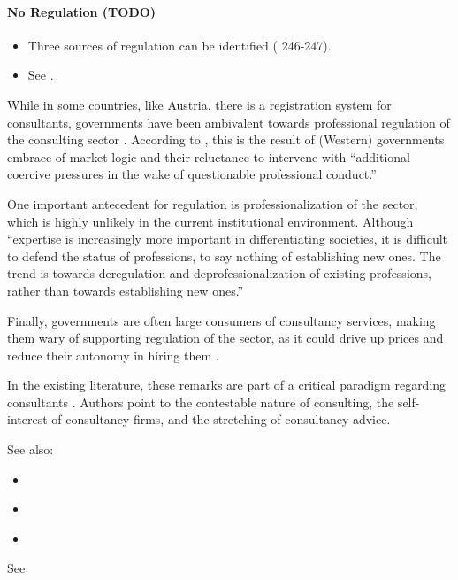 \documentclass[12pt]{article}
\providecommand{\tightlist}{%
  \setlength{\itemsep}{0pt}\setlength{\parskip}{0pt}}
\begin{document}
\paragraph{No Regulation (TODO)}\label{no-regulation-todo}

\begin{itemize}
\tightlist
\item
  Three sources of regulation can be identified (\citet{clark1993}
  246-247).
\item
  See \citet[813-817]{muzio2011}.
\end{itemize}

While in some countries, like Austria, there is a registration system
for consultants, governments have been ambivalent towards professional
regulation of the consulting sector \citep[ 814]{muzio2011}. According
to \citet{leicht2006}, this is the result of (Western) governments
embrace of market logic and their reluctance to intervene with
``additional coercive pressures in the wake of questionable professional
conduct.''

One important antecedent for regulation is professionalization of the
sector, which is highly unlikely in the current institutional
environment. Although ``expertise is increasingly more important in
differentiating societies, it is difficult to defend the status of
professions, to say nothing of establishing new ones. The trend is
towards deregulation and deprofessionalization of existing professions,
rather than towards establishing new ones.'' \citep[ 90]{kieser2006}

Finally, governments are often large consumers of consultancy services,
making them wary of supporting regulation of the sector, as it could
drive up prices and reduce their autonomy in hiring them \citep[
815]{muzio2011}.

In the existing literature, these remarks are part of a critical
paradigm regarding consultants \citep[ 4-5]{armbruster2006}. Authors
point to the contestable nature of consulting, the self-interest of
consultancy firms, and the stretching of consultancy advice.

See also:

\begin{itemize}
\tightlist
\item
  \citep{wright2002}
\item
  \citep{david2013}
\item
  \citep{mahoney2016}
\end{itemize}

See \citet[3-4]{sturdy2021}
\end{document}
